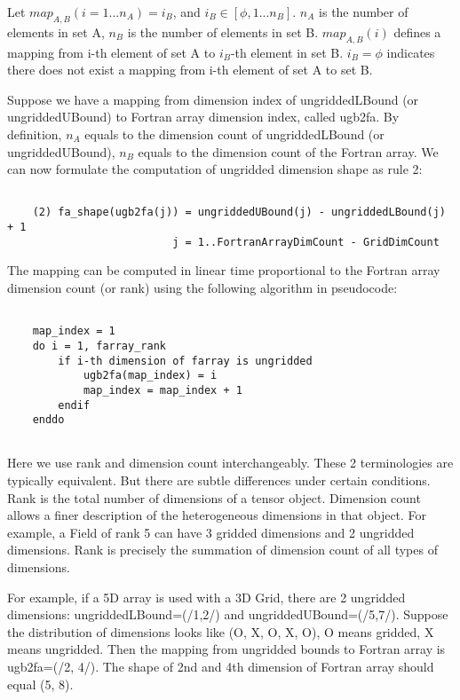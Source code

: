     Let $map_{A,B}(i=1...n_A) = i_B$, and $i_B \in [\phi, 1...n_B]$. $n_A$ is the number
    of elements in set A, $n_B$ is the number of elements in set B. $map_{A,B}(i)$ defines
    a mapping from i-th element of set A to $i_B$-th element in set B. $i_B = \phi$ 
    indicates there does not exist a mapping from i-th element of set A to set B.
  
    Suppose we have a mapping from dimension index of ungriddedLBound (or
    ungriddedUBound) to Fortran array dimension index, called ugb2fa. 
    By definition, $n_A$ equals to the dimension count of
    ungriddedLBound (or ungriddedUBound), $n_B$ equals to the dimension count of
    the Fortran array. We can now formulate the computation of ungridded
    dimension shape as rule 2:
    \begin{verbatim}
   
    (2) fa_shape(ugb2fa(j)) = ungriddedUBound(j) - ungriddedLBound(j) + 1 
                          j = 1..FortranArrayDimCount - GridDimCount 
    \end{verbatim}
  
    The mapping can be computed in linear time proportional to the
    Fortran array dimension count (or rank) using the following algorithm in pseudocode:
    \begin{verbatim}
  
    map_index = 1
    do i = 1, farray_rank
        if i-th dimension of farray is ungridded
            ugb2fa(map_index) = i
            map_index = map_index + 1
        endif
    enddo
   
    \end{verbatim}
  
    Here we use rank and dimension count interchangeably. These 2 terminologies are typically
    equivalent. But there are subtle differences
    under certain conditions. Rank is the total number of dimensions of a tensor object.
    Dimension count allows a finer description of the heterogeneous dimensions in that object.
    For example, a Field of rank 5 can have 3 gridded dimensions and 2 ungridded dimensions.
    Rank is precisely the summation of dimension count of all types of dimensions. 
   
    For example, if a 5D array is used with a 3D Grid, there are 2 ungridded dimensions:
    ungriddedLBound=(/1,2/) and ungriddedUBound=(/5,7/).
    Suppose the distribution of dimensions looks like (O, X, O, X, O), O means gridded,
    X means ungridded. Then the mapping from ungridded bounds to Fortran array is
    ugb2fa=(/2, 4/). The shape of 2nd and 4th dimension of Fortran array should equal
    (5, 8).
   
